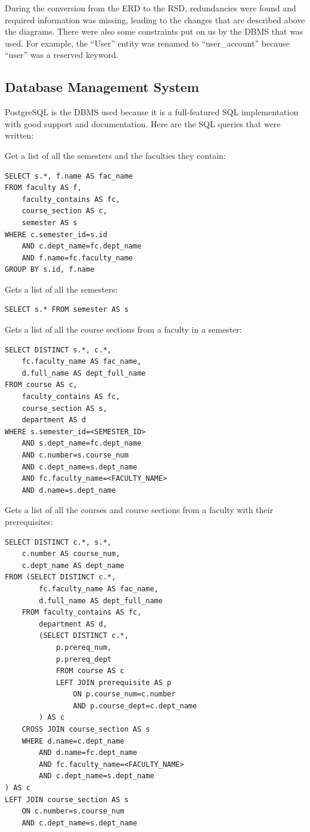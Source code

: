 \documentclass[twoside=false,a4paper,11pt]{article}
\theoremstyle{mytheor}
\begin{document}
During the conversion from the ERD to the RSD, redundancies were found and required information was missing, leading to the changes that are described above the diagrams. There were also some constraints put on us by the DBMS that was used. For example, the ``User'' entity was renamed to ``user\_account'' because ``user'' was a reserved keyword.

\subsection*{Database Management System}

PostgreSQL is the DBMS used because it is a full-featured SQL implementation with good support and documentation. Here are the SQL queries that were written:

Get a list of all the semesters and the faculties they contain:
\begin{lstlisting}
SELECT s.*, f.name AS fac_name
FROM faculty AS f,
	faculty_contains AS fc,
	course_section AS c,
	semester AS s
WHERE c.semester_id=s.id
	AND c.dept_name=fc.dept_name
	AND f.name=fc.faculty_name
GROUP BY s.id, f.name
\end{lstlisting}

Gets a list of all the semesters:
\begin{lstlisting}
SELECT s.* FROM semester AS s
\end{lstlisting}

Gets a list of all the course sections from a faculty in a semester:
\begin{lstlisting}
SELECT DISTINCT s.*, c.*,
	fc.faculty_name AS fac_name,
	d.full_name AS dept_full_name
FROM course AS c,
	faculty_contains AS fc,
	course_section AS s,
	department AS d
WHERE s.semester_id=<SEMESTER_ID>
	AND s.dept_name=fc.dept_name
	AND c.number=s.course_num
	AND c.dept_name=s.dept_name
	AND fc.faculty_name=<FACULTY_NAME>
	AND d.name=s.dept_name
\end{lstlisting}

\pagebreak

Gets a list of all the courses and course sections from a faculty with their prerequisites:
\begin{lstlisting}
SELECT DISTINCT c.*, s.*,
	c.number AS course_num,
	c.dept_name AS dept_name
FROM (SELECT DISTINCT c.*,
		fc.faculty_name AS fac_name,
		d.full_name AS dept_full_name
	FROM faculty_contains AS fc,
		department AS d,
		(SELECT DISTINCT c.*,
			p.prereq_num,
			p.prereq_dept
			FROM course AS c
			LEFT JOIN prerequisite AS p
				ON p.course_num=c.number
				AND p.course_dept=c.dept_name
		) AS c
	CROSS JOIN course_section AS s
	WHERE d.name=c.dept_name
		AND d.name=fc.dept_name
		AND fc.faculty_name=<FACULTY_NAME>
		AND c.dept_name=s.dept_name
) AS c
LEFT JOIN course_section AS s
	ON c.number=s.course_num
	AND c.dept_name=s.dept_name
\end{lstlisting}
\end{document}
